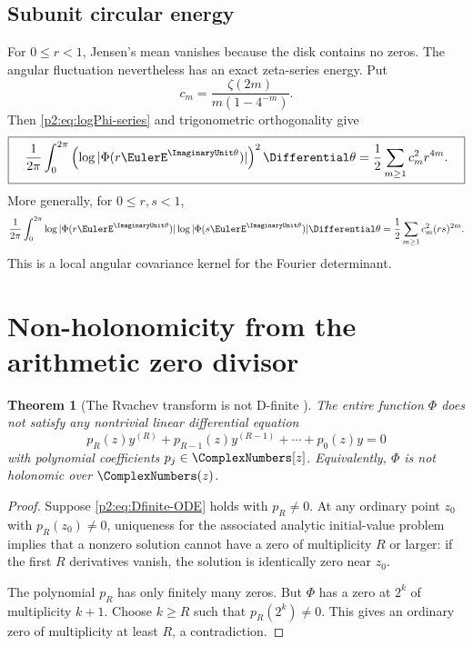 \documentclass[11pt]{article}
\newtheorem{theorem}{Theorem}[section]
\theoremstyle{definition}
\theoremstyle{remark}
\begin{document}
\subsection{Subunit circular energy}

For $0\le r<1$, Jensen's mean vanishes because the disk contains no zeros.  The angular
fluctuation nevertheless has an exact zeta-series energy.  Put
\begin{equation}
 c_m=\frac{\zeta(2m)}{m(1-4^{-m})}.                       \label{p2:eq:cm}
\end{equation}
Then \eqref{p2:eq:logPhi-series} and trigonometric orthogonality give
\begin{equation}
 \boxed{\quad
 \frac1{2\pi}\int_0^{2\pi}
 \left(\log|\Phi(r\EulerE^{\ImaginaryUnit\theta})|\right)^2\Differential\theta
 =\frac12\sum_{m\ge1}c_m^2r^{4m}.
 \quad}                                                  \label{p2:eq:J-energy}
\end{equation}
More generally, for $0\le r,s<1$,
\begin{equation}
 \frac1{2\pi}\int_0^{2\pi}
 \log|\Phi(r\EulerE^{\ImaginaryUnit\theta})|
 \log|\Phi(s\EulerE^{\ImaginaryUnit\theta})|\Differential\theta
 =\frac12\sum_{m\ge1}c_m^2(rs)^{2m}.                   \label{p2:eq:J-covariance}
\end{equation}
This is a local angular covariance kernel for the Fourier determinant.

\section{Non-holonomicity from the arithmetic zero divisor}
\label{p2:sec:nonDfinite}

\begin{theorem}[The Rvachev transform is not D-finite \New]
The entire function $\Phi$ does not satisfy any nontrivial linear differential equation
\begin{equation}
 p_R(z)y^{(R)}+p_{R-1}(z)y^{(R-1)}+\cdots+p_0(z)y=0       \label{p2:eq:Dfinite-ODE}
\end{equation}
with polynomial coefficients $p_j\in\ComplexNumbers[z]$.  Equivalently, $\Phi$ is not holonomic over
$\ComplexNumbers(z)$.
\end{theorem}

\begin{proof}
Suppose \eqref{p2:eq:Dfinite-ODE} holds with $p_R\ne0$.  At any ordinary point
$z_0$ with $p_R(z_0)\ne0$, uniqueness for the associated analytic initial-value problem
implies that a nonzero solution cannot have a zero of multiplicity $R$ or larger: if the
first $R$ derivatives vanish, the solution is identically zero near $z_0$.

The polynomial $p_R$ has only finitely many zeros.  But $\Phi$ has a zero at $2^k$ of
multiplicity $k+1$.  Choose $k\ge R$ such that $p_R(2^k)\ne0$.  This gives an ordinary zero
of multiplicity at least $R$, a contradiction.
\end{proof}
\end{document}
